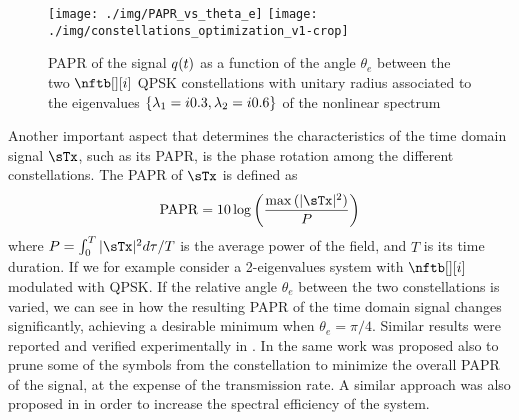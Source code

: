 \begin{figure}[t]
   \centering
   \texttt{[image: ./img/PAPR\_vs\_theta\_e]}
   \texttt{[image: ./img/constellations\_optimization\_v1-crop]}
   \caption{\ac{PAPR} of the signal $\nflds$ as a function of the angle $\theta_e$ between the two $\nftb[][i]$ \ac{QPSK} constellations with unitary radius associated to the eigenvalues $\{\eig[1]=\iunit0.3, \eig[2]=\iunit 0.6\}$ of the nonlinear spectrum}
  \label{fig:paprVStheta}
\end{figure}

Another  important aspect that determines the characteristics of the time domain signal $\sTx$, such as its
\acf{PAPR}, %
is the phase rotation among the different constellations.
The \ac{PAPR} of $\sTx$ is defined as
\begin{equation}
\papr = 10 \log \left( \dfrac{ \max{(|\sTx|^2)}}{P} \right)
\end{equation}
where $P = \int_0^{T}{ |\sTx|^2 } d\ttm / T$ is the average power of the field,  and $T$ is its time duration.
If we for example
consider a 2-eigenvalues system with $\nftb[][i]$ modulated with \ac{QPSK}. If the relative angle $\theta_e$ between the two constellations is varied, we can see in
 how the resulting
\ac{PAPR} %
of the time domain signal changes significantly, achieving a desirable minimum when $\theta_e = \pi/4$. Similar results were reported and verified
experimentally in \cite{bulow2016experimental, Aref3}.
In the same work was proposed also to prune some of the symbols from the constellation to minimize the overall \ac{PAPR} of the signal, at the expense of the transmission rate. A similar approach was also proposed in \cite{hari2016multieigenvalue} in order to increase the spectral efficiency of the system.

